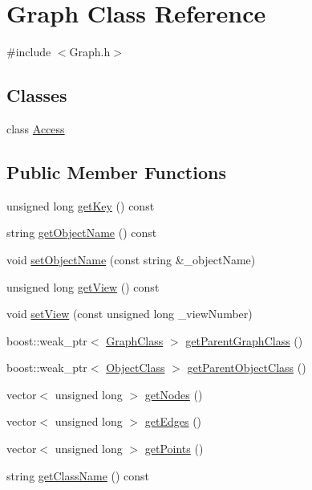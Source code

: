 \hypertarget{class_graph}{}\section{Graph Class Reference}
\label{class_graph}


{\ttfamily \#include $<$Graph.\+h$>$}

\subsection*{Classes}
\begin{DoxyCompactItemize}
\item 
class \hyperlink{class_graph_1_1_access}{Access}
\end{DoxyCompactItemize}
\subsection*{Public Member Functions}
\begin{DoxyCompactItemize}
\item 
unsigned long \hyperlink{class_graph_a16b229cfa242df2ca52672ecb307e6cf}{get\+Key} () const 
\item 
string \hyperlink{class_graph_a05144034d7b7a8b6f48df5034eca9db3}{get\+Object\+Name} () const 
\item 
void \hyperlink{class_graph_a062efa5c2228049c58ae37f8a348c32a}{set\+Object\+Name} (const string \&\+\_\+object\+Name)
\item 
unsigned long \hyperlink{class_graph_a21782100883833fd572caac0f9031d1e}{get\+View} () const 
\item 
void \hyperlink{class_graph_a4c0942f8583f2f95c2b002e4900f76b7}{set\+View} (const unsigned long \+\_\+view\+Number)
\item 
boost\+::weak\+\_\+ptr$<$ \hyperlink{class_graph_class}{Graph\+Class} $>$ \hyperlink{class_graph_ac3647d923d85ad614032c88d4f25ad52}{get\+Parent\+Graph\+Class} ()
\item 
boost\+::weak\+\_\+ptr$<$ \hyperlink{class_object_class}{Object\+Class} $>$ \hyperlink{class_graph_a995aa2eed16acaef2cd9aa9e668ff576}{get\+Parent\+Object\+Class} ()
\item 
vector$<$ unsigned long $>$ \hyperlink{class_graph_acc1ba3e41a64dbdd3dd294c5e3dc0a74}{get\+Nodes} ()
\item 
vector$<$ unsigned long $>$ \hyperlink{class_graph_ac97ef9b1dd075a830a64de97ee0407fc}{get\+Edges} ()
\item 
vector$<$ unsigned long $>$ \hyperlink{class_graph_a568297722e39ec61c156bae1245983dd}{get\+Points} ()
\item 
string \hyperlink{class_graph_aa5ac93dd33d705adb8011cda81311a30}{get\+Class\+Name} () const 
\end{DoxyCompactItemize}

